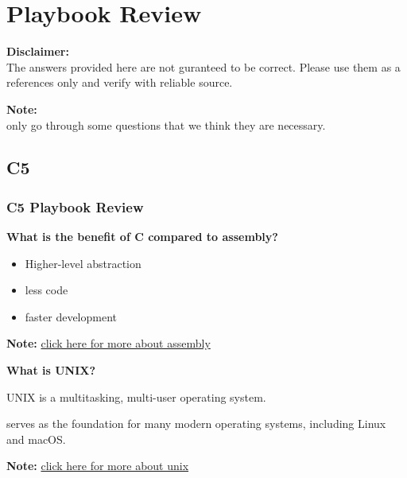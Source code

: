 \documentclass[
	11pt, %
]{beamer}
\begin{document}
\section{Playbook Review} %

\begin{frame}
	\textbf{Disclaimer:}\\
    The answers provided here are not guranteed to be correct. Please
    use them as a references only and verify with reliable source.

    \smallskip

    \textbf{Note:}\\
     only go through some questions that we think they are necessary.
	
\end{frame}

\subsection{C5}




\begin{frame}
	\frametitle{C5 Playbook Review}
	\textbf{What is the benefit of C compared to assembly?}

	\begin{itemize}
		\item Higher-level abstraction
		\item less code
		\item faster development
	\end{itemize}
	\textbf{Note:} \href{https://www.investopedia.com/terms/a/assembly-language.asp}{click here for more about assembly}


	\smallskip

	\textbf{What is UNIX?}

	UNIX is a multitasking, multi-user operating system.

	serves as the foundation for many modern operating systems, including Linux and macOS.
	
	\textbf{Note:} \href{https://www.techtarget.com/searchdatacenter/definition/Unix}{click here for more about unix}
\end{frame}
\end{document}

